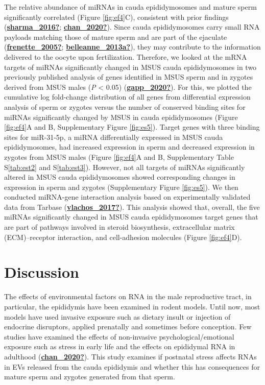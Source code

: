 \documentclass[12pt,twoside]{reedthesis}
\begin{document}
The relative abundance of miRNAs in cauda epididymosomes and mature
sperm significantly correlated (Figure \ref{fig:ef4}C), consistent with prior
findings (\protect\hyperlink{ref-sharma_2016}{\textbf{sharma\_2016?}}; \protect\hyperlink{ref-chan_2020}{\textbf{chan\_2020?}}). Since cauda epididymosomes carry
small RNA payloads matching those of mature sperm and are part of the
ejaculate (\protect\hyperlink{ref-frenette_2005}{\textbf{frenette\_2005?}}; \protect\hyperlink{ref-belleanne_2013a}{\textbf{belleanne\_2013a?}}), they may contribute to the
information delivered to the oocyte upon fertilization. Therefore, we
looked at the mRNA targets of miRNAs significantly changed in MSUS cauda
epididymosomes in two previously published analysis of genes identified
in MSUS sperm and in zygotes derived from MSUS males (\emph{P} \textless{} 0.05)
(\protect\hyperlink{ref-gapp_2020}{\textbf{gapp\_2020?}}). For this, we plotted the cumulative log fold-change
distribution of all genes from differential expression analysis of sperm
or zygotes versus the number of conserved binding sites for miRNAs
significantly changed by MSUS in cauda epididymosomes (Figure \ref{fig:ef4}A and
B, Supplementary Figure \ref{fig:es5}). Target genes with three binding sites
for miR-31-5p, a miRNA differentially expressed in MSUS cauda
epididymosomes, had increased expression in sperm and decreased
expression in zygotes from MSUS males (Figure \ref{fig:ef4}A and B, Supplementary
Table S\ref{tab:est2} and S\ref{tab:est3}). However, not all targets of miRNAs significantly
altered in MSUS cauda epididymosomes showed corresponding changes in
expression in sperm and zygotes (Supplementary Figure \ref{fig:es5}). We then
conducted miRNA-gene interaction analysis based on experimentally
validated data from Tarbase (\protect\hyperlink{ref-vlachos_2017}{\textbf{vlachos\_2017?}}). This analysis showed that,
overall, the five miRNAs significantly changed in MSUS cauda
epididymosomes target genes that are part of pathways involved in
steroid biosynthesis, extracellular matrix (ECM)--receptor interaction,
and cell-adhesion molecules (Figure \ref{fig:ef4}D).

\hypertarget{discussion-1}{%
\section{Discussion}\label{discussion-1}}

The effects of environmental factors on RNA in the male reproductive
tract, in particular, the epididymis have been examined in rodent
models. Until now, most models have used invasive exposure such as
dietary insult or injection of endocrine disruptors, applied prenatally
and sometimes before conception. Few studies have examined the effects
of non-invasive psychological/emotional exposure such as stress in early
life and the effects on epididymal RNA in adulthood (\protect\hyperlink{ref-chan_2020}{\textbf{chan\_2020?}}). This
study examines if postnatal stress affects RNAs in EVs released from the
cauda epididymis and whether this has consequences for mature sperm and
zygotes generated from that sperm.
\end{document}
